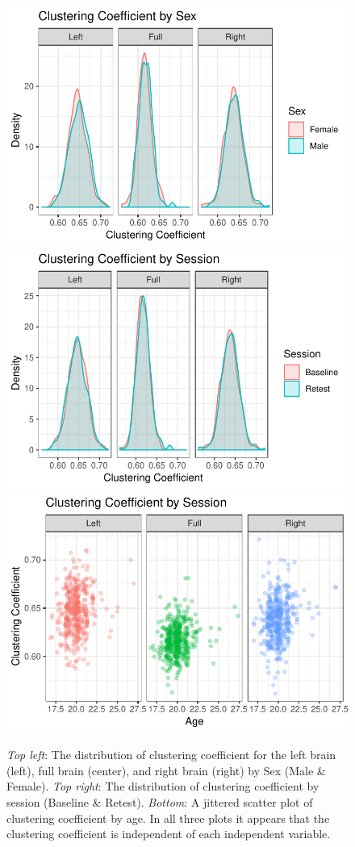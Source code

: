 \documentclass[01pt]{article}
\begin{document}
\begin{figure}[h!]
   \begin{adjustwidth}{-.5in}{-.5in}
    \centering
    \includegraphics[width = .4\linewidth, height = .3\linewidth]{figures/clustering_coef_male_versus_female.pdf}
    \includegraphics[width = .4\linewidth, height = .3\linewidth]{figures/clustering_coef_session_by_session.pdf}\\
    \includegraphics[width = .45\linewidth, height = .3\linewidth]{figures/clustering_coef_by_age.pdf}
    \caption{\textit{Top left}: The distribution of clustering coefficient for the left brain (left), full brain (center), and right brain (right) by Sex (Male \& Female). \textit{Top right}: The distribution of clustering coefficient by session (Baseline \& Retest). \textit{Bottom}: A jittered scatter plot of clustering coefficient by age. In all three plots it appears that the clustering coefficient is independent of each independent variable.}
    \label{fig:CC_by_phenotype}
    \end{adjustwidth}
\end{figure}
\end{document}
